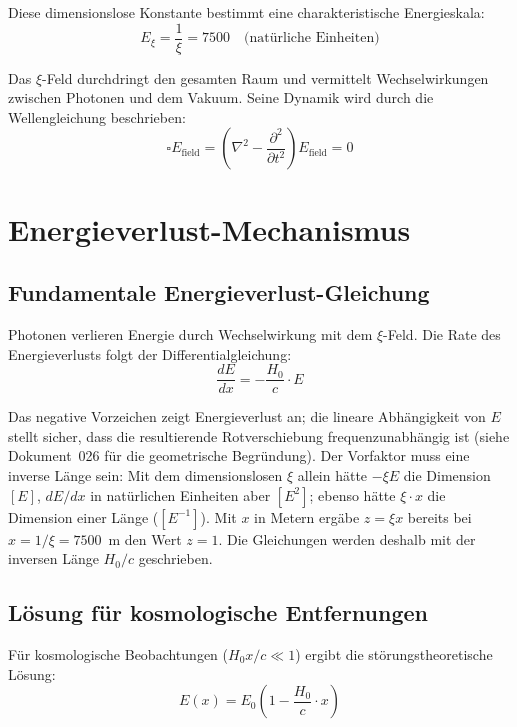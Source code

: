 	Diese dimensionslose Konstante bestimmt eine charakteristische Energieskala:
	\begin{equation}
		E_\xi = \frac{1}{\xi} = 7500 \quad \text{(natürliche Einheiten)}
	\end{equation}

	Das $\xi$-Feld durchdringt den gesamten Raum und vermittelt Wechselwirkungen zwischen Photonen und dem Vakuum. Seine Dynamik wird durch die Wellengleichung beschrieben:
	\begin{equation}
		\square E_{\text{field}} = \left(\nabla^2 - \frac{\partial^2}{\partial t^2}\right) E_{\text{field}} = 0
	\end{equation}

\section{Energieverlust-Mechanismus}

	\subsection{Fundamentale Energieverlust-Gleichung}

	Photonen verlieren Energie durch Wechselwirkung mit dem $\xi$-Feld. Die Rate des Energieverlusts folgt der Differentialgleichung:
	\begin{equation}
		\frac{dE}{dx} = -\frac{H_0}{c} \cdot E
	\end{equation}

	Das negative Vorzeichen zeigt Energieverlust an; die lineare Abhängigkeit von $E$ stellt sicher, dass die resultierende Rotverschiebung frequenzunabhängig ist (siehe Dokument~026 für die geometrische Begründung). Der Vorfaktor muss eine inverse Länge sein: Mit dem dimensionslosen $\xi$ allein hätte $-\xi E$ die Dimension $[E]$, $dE/dx$ in natürlichen Einheiten aber $[E^2]$; ebenso hätte $\xi \cdot x$ die Dimension einer Länge ($[E^{-1}]$). Mit $x$ in Metern ergäbe $z = \xi x$ bereits bei $x = 1/\xi = 7500$~m den Wert $z = 1$. Die Gleichungen werden deshalb mit der inversen Länge $H_0/c$ geschrieben.

	\subsection{Lösung für kosmologische Entfernungen}

	Für kosmologische Beobachtungen ($H_0 x/c \ll 1$) ergibt die störungstheoretische Lösung:
	\begin{equation}
		E(x) = E_0 \left(1 - \frac{H_0}{c} \cdot x\right)
	\end{equation}

